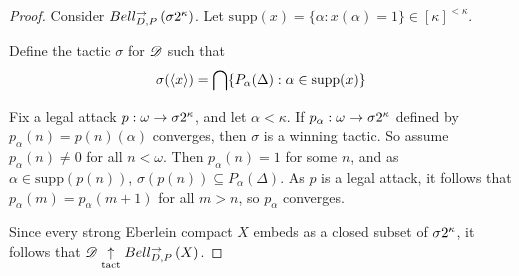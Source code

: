 \documentclass[11pt]{article}
\begin{document}
  \begin{proof}
    Consider $Bell_{D,P}^{\to}\left({\sigma2^{\kappa}}\right)$. Let
    $\text{supp}(x)=\{\alpha:x(\alpha)=1\}\in[\kappa]^{<\kappa}$.

    Define the tactic $\sigma$ for $\mathscr{D}$ such that
      \[
        \sigma(\langle x\rangle)
          =
        \bigcap\{
          P_\alpha(\Delta) : \alpha\in\text{supp}(x)
        \}
      \]

    Fix a legal attack $p:\omega\to\sigma2^{\kappa}$, and let
    $\alpha<\kappa$. If $p_\alpha:\omega\to\sigma2^{\kappa}$ defined by
    $p_\alpha(n)=p(n)(\alpha)$ converges, then $\sigma$ is a winning
    tactic. So assume $p_\alpha(n)\not=0$ for all $n<\omega$.
    Then $p_\alpha(n)=1$ for some $n$, and as $\alpha\in\text{supp}(p(n))$,
    $\sigma(p(n))\subseteq P_\alpha(\Delta)$. As $p$ is a legal attack,
    it follows that $p_\alpha(m)=p_\alpha(m+1)$ for all $m>n$, so
    $p_\alpha$ converges.

    Since every strong Eberlein compact $X$ embeds as a closed subset of
    $\sigma2^{\kappa}$, it follows that $\mathscr{D}\underset{\text{tact}}{\uparrow}Bell_{D,P}^{\to}\left({X}\right)$.
  \end{proof}
\end{document}
